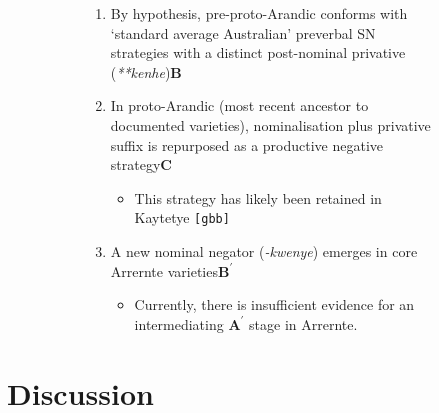 \documentclass[usenames,dvipsnames,11pt]{article}
\begin{document}
{\begin{figure}[H]
\begin{subfigure}{.3\textwidth}
\end{subfigure}
\begin{subfigure}{.68\textwidth}
	\begin{enumerate}[\bf i]
		\item By hypothesis, pre-proto-Arandic conforms with `standard average Australian' preverbal SN strategies with a distinct post-nominal privative (\textit{**kenhe})\hfill $\boldsymbol B$ 
		\item In proto-Arandic (most recent ancestor to documented varieties), nominalisation plus privative suffix is repurposed as a productive negative strategy\hfill$\boldsymbol C$
		\begin{itemize}
			\item This strategy has likely been retained in Kaytetye \texttt{[gbb]}
		\end{itemize}
		\item A new nominal negator (\textit{-kwenye}) emerges in core Arrernte varieties\hfill$\boldsymbol{B^\prime}$
		\begin{itemize}
			\item Currently, there is insufficient evidence for an intermediating $\boldsymbol{A^\prime}$ stage in Arrernte.
		\end{itemize}	
	\end{enumerate}
\end{subfigure}
\end{figure}

\iffalse{\color{violet}\begin{itemize}
			\item Arandic: obligatory nominalisation of negated clauses in paradigm
		\item Karnic: ?
		\item Wati: ?? check onenote for any interesting observations.
	\end{itemize}}\fi

\section{Discussion}\label{disc}



}
\end{document}
